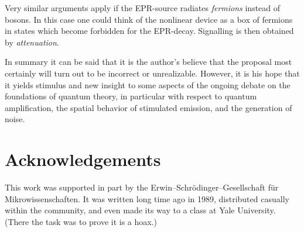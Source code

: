 Very similar arguments apply if the EPR-source radiates {\em fermions} instead of bosons.
In this case one could think of the nonlinear device as a box
of fermions in states which become forbidden for the EPR-decay.
Signalling is then obtained by {\em attenuation}.

      In summary it can be said that it is the author's believe that
 the proposal most certainly will turn out to be incorrect or
 unrealizable.  However, it is his hope that it yields stimulus and new
 insight to some aspects of the ongoing debate on the foundations of
 quantum theory, in particular with respect to quantum amplification,
the spatial behavior of stimulated emission,
 and the generation of noise.

 \section{Acknowledgements}
This work was supported in part by the
Erwin--Schr\"odinger--Gesellschaft f\"ur Mikrowissenschaften.
It was written long time ago in 1989,  distributed casually within the community,
and even made its way to a class at Yale University.
(There the task was to prove it is a hoax.)

%
%

